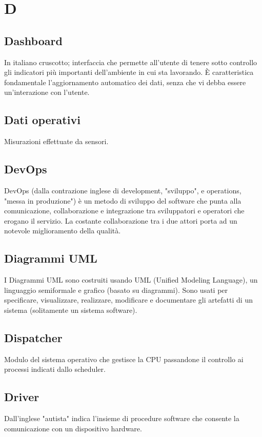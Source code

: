 \clearpage
\section*{D}

\subsection*{Dashboard}
In italiano cruscotto; interfaccia che permette all'utente di tenere sotto controllo gli indicatori più importanti dell'ambiente in cui sta lavorando. È caratteristica fondamentale l'aggiornamento automatico dei dati, senza che vi debba essere un'interazione con l'utente.

\subsection*{Dati operativi}
Misurazioni effettuate da sensori.

\subsection*{DevOps}
DevOps (dalla contrazione inglese di development, "sviluppo", e operations, "messa in produzione") è un metodo di sviluppo del software che punta alla comunicazione, collaborazione e integrazione tra sviluppatori e operatori che erogano il servizio. La costante collaborazione tra i due attori porta ad un notevole miglioramento della qualità.

\subsection*{Diagrammi UML}
I Diagrammi UML sono costruiti usando UML (Unified Modeling Language), un linguaggio semiformale e grafico (basato su diagrammi). Sono usati per specificare, visualizzare, realizzare, modificare e documentare gli artefatti di un sistema (solitamente un sistema software).

\subsection*{Dispatcher}
Modulo del sistema operativo che gestisce la CPU passandone il controllo ai processi indicati dallo scheduler.

\subsection*{Driver}
Dall'inglese "autista" indica l'insieme di procedure software che consente la comunicazione con un dispositivo hardware.

